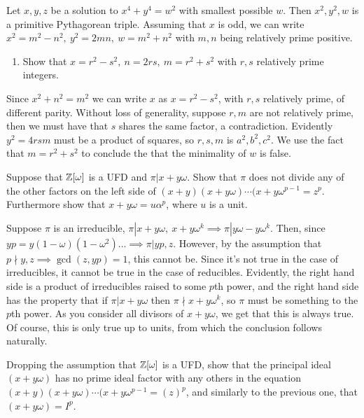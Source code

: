 \begin{problem}
Let \(x,y,z\) be a solution to \(x^4+y^4=w^2\) with smallest possible \(w\). Then \(x^2,y^2,w\) is a primitive Pythagorean triple. Assuming that \(x\) is odd, we can write \(x^2 = m^2-n^2, \ y^2 =2mn, \ w=m^2+n^2\) with \(m,n\) being relatively prime positive.
\begin{enumerate}[label=(\alph*)]
    \item Show that \(x = r^2-s^2, \ n=2rs, \ m=r^2+s^2 \) with \(r,s\) relatively prime integers.
\end{enumerate}
\end{problem}
Since \(x^2+n^2=m^2\) we can write \(x\) as \(x=r^2-s^2\), with \(r,s\) relatively prime, of different parity. Without loss of generality, suppose \(r,m\) are not relatively prime, then we must have that \(s\) shares the same factor, a contradiction. Evidently \(y^2=4rsm\) must be a product of squares, so \(r,s,m\) is \(a^2,b^2,c^2\). We use the fact that \(m=r^2+s^2\) to conclude the that the minimality of \(w\) is false.
\begin{problem}
Suppose that \(\mathbb Z[\omega]\) is a UFD and \(\pi | x+y\omega\). Show that \(\pi\) does not divide any of the other factors on the left side of \((x+y)(x+y\omega)\cdots (x+y\omega^{p-1}=z^p\). Furthermore show that \(x+y\omega = u \alpha^p\), where \(u\) is a unit.
\end{problem}
Suppose \(\pi\) is an irreducible, \(\pi | x+y\omega, \ x+y\omega^k \implies \pi | y\omega-y\omega^k\). Then, since \(yp = y(1-\omega)(1-\omega^2) \dots \implies \pi | yp, z\). However, by the assumption that \(p \nmid y,z \implies \gcd(z,yp)=1\), this cannot be. Since it's not true in the case of irreducibles, it cannot be true in the case of reducibles. Evidently, the right hand side is a product of irreducibles raised to some \(p\)th power, and the right hand side has the property that if \(\pi | x+y\omega\) then \(\pi \nmid x+y\omega^k\), so \(\pi\) must be something to the \(p\)th power. As you consider all divisors of \(x+y\omega\), we get that this is always true. Of course, this is only true up to units, from which the conclusion follows naturally.
\begin{problem}
Dropping the assumption that \(\mathbb Z[\omega]\) is a UFD, show that the principal ideal \((x+y\omega)\) has no prime ideal factor with any others in the equation \((x+y)(x+y\omega)\cdots (x+y\omega^{p-1} = (z)^p\), and similarly to the previous one, that \((x+y\omega)=I^p\).
\end{problem}